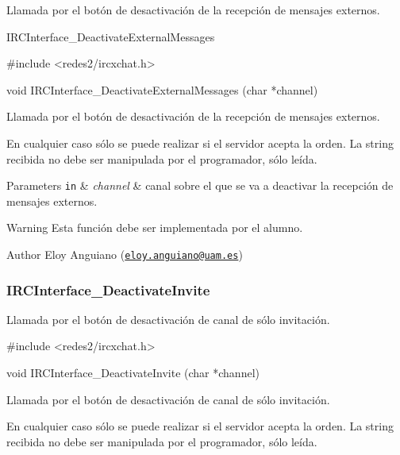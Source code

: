  Llamada por el botón de desactivación de la recepción de mensajes externos.

I\+R\+C\+Interface\+\_\+\+Deactivate\+External\+Messages


\begin{DoxyCode}
\textcolor{preprocessor}{#include <redes2/ircxchat.h>}

\textcolor{keywordtype}{void} IRCInterface\_DeactivateExternalMessages (\textcolor{keywordtype}{char} *channel)
\end{DoxyCode}


Llamada por el botón de desactivación de la recepción de mensajes externos.

En cualquier caso sólo se puede realizar si el servidor acepta la orden. La string recibida no debe ser manipulada por el programador, sólo leída.


\begin{DoxyParams}[1]{Parameters}
\mbox{\tt in}  & {\em channel} & canal sobre el que se va a deactivar la recepción de mensajes externos.\\
\hline
\end{DoxyParams}
\begin{DoxyWarning}{Warning}
Esta función debe ser implementada por el alumno.
\end{DoxyWarning}
\begin{DoxyAuthor}{Author}
Eloy Anguiano (\href{mailto:eloy.anguiano@uam.es}{\tt eloy.\+anguiano@uam.\+es})
\end{DoxyAuthor}


 \hypertarget{IRCInterface_DeactivateInvite}{}\subsubsection{I\+R\+C\+Interface\+\_\+\+Deactivate\+Invite}\label{IRCInterface_DeactivateInvite}
Llamada por el botón de desactivación de canal de sólo invitación.


\begin{DoxyCode}
\textcolor{preprocessor}{#include <redes2/ircxchat.h>}

\textcolor{keywordtype}{void} IRCInterface\_DeactivateInvite (\textcolor{keywordtype}{char} *channel)
\end{DoxyCode}


Llamada por el botón de desactivación de canal de sólo invitación.

En cualquier caso sólo se puede realizar si el servidor acepta la orden. La string recibida no debe ser manipulada por el programador, sólo leída.


